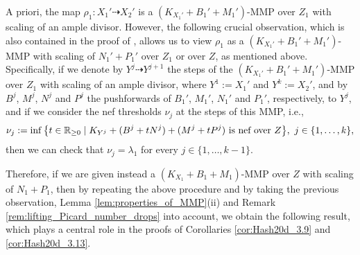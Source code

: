 	A priori, the map $ \rho_1 \colon X_1' \dashrightarrow X_2' $ is a $(K_{X_1'}+B_1'+M_1')$-MMP over $ Z_1 $ with scaling of an ample divisor. However, the following crucial observation, which is also contained in the proof of \cite[Lemma 2.13]{LT22b}, allows us to view $\rho_1$ as a $(K_{X_1'}+B_1'+M_1')$-MMP with scaling of $ N_1' + P_1' $ over $Z_1$ or over $ Z $, as mentioned above. Specifically, if we denote by $ Y^j \dashrightarrow Y^{j+1} $ the steps of the $(K_{X_1'}+B_1'+M_1')$-MMP over $ Z_1 $ with scaling of an ample divisor, where $ Y^1 := X_1' $ and $ Y^k := X_2' $, and by $B^j$, $M^j$, $N^j$ and $P^j$ the pushforwards of $B_1'$, $M_1'$, $N_1'$ and $P_1'$, respectively, to $Y^j$, and if we consider the nef thresholds $\nu_j$ at the steps of this MMP, i.e., 
	$$ \nu_j := \inf \big\{ t \in \mathbb{R}_{\geq 0} \mid K_{Y^j} + (B^j + t N^j) + (M^j + t P^j) \text{ is nef over } Z \big\} , \ j \in \{1,\dots,k \} , $$
	then we can check that $ \nu_j = \lambda_1 $ for every $ j \in \{1, \dots, k-1 \} $.
	
	Therefore, if we are given instead a $ (K_{X_1}+B_1+M_1)$-MMP over $Z$ with scaling of $N_1 + P_1$, then by repeating the above procedure and by taking the previous observation, Lemma \ref{lem:properties_of_MMP}(ii) and Remark \ref{rem:lifting_Picard_number_drops} into account, we obtain the following result, which plays a central role in the proofs of Corollaries \ref{cor:Hash20d_3.9} and \ref{cor:Hash20d_3.13}.
	
